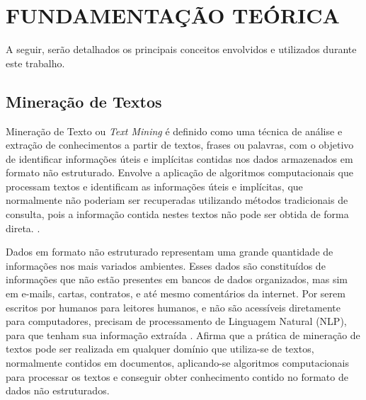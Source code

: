 \section{FUNDAMENTAÇÃO TEÓRICA}

A seguir, serão detalhados os principais conceitos envolvidos e utilizados durante este trabalho.

\subsection{Mineração de Textos}
Mineração de Texto ou \textit{Text Mining} é definido como uma técnica de análise e extração de conhecimentos a partir de textos, frases ou palavras, com o objetivo de identificar informações úteis e implícitas contidas nos dados armazenados em formato não estruturado. Envolve a aplicação de algoritmos computacionais que processam textos e identificam as informações úteis e implícitas, que normalmente não poderiam ser recuperadas utilizando métodos tradicionais de consulta, pois a informação contida nestes textos não pode ser obtida de forma direta. \cite{morais2007mineraccao}.

Dados em formato não estruturado representam uma grande quantidade de informações nos mais variados ambientes. Esses dados são constituídos de informações que não estão presentes em bancos de dados organizados, mas sim em e-mails, cartas, contratos, e até mesmo comentários da internet. Por serem escritos por humanos para leitores humanos, e não são acessíveis diretamente para computadores, precisam de processamento de Linguagem Natural (NLP), para que tenham sua informação extraída \cite{Dorre1999TMFTextMining}.  Afirma que a prática de mineração de textos pode ser realizada em qualquer domínio que utiliza-se de textos, normalmente contidos em documentos, aplicando-se algoritmos computacionais para processar os textos e conseguir obter conhecimento contido no formato de dados não estruturados. 

